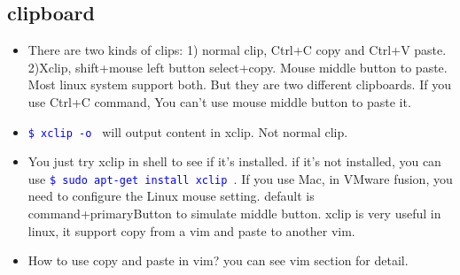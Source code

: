 \documentclass[a4paper,12pt,twoside]{book}
\newcommand{\linuxcommand}[1]{\texttt{\textcolor{blue}{\$ #1 \Pisymbol{psy}{191}}}}
\begin{document}
\subsection{clipboard}
	\begin{itemize}
			\item There are two kinds of clips: 1) normal clip, Ctrl+C copy and Ctrl+V paste. 2)Xclip, shift+mouse left button select+copy. Mouse middle button to paste. Most linux system support both. But they are two different clipboards. If you use Ctrl+C command, You can't use mouse middle button to paste it.
			
			\item \linuxcommand{xclip -o} will output content in xclip. Not normal clip.
					
			\item You just try xclip in shell to see if it's installed. if it's not installed, you can use \linuxcommand{sudo apt-get install xclip}. If you use Mac, in VMware fusion, you need to configure the Linux mouse setting.  default is command+primaryButton to simulate middle button.  xclip is very useful in linux, it support copy from a vim and paste to another vim.  

			\item How to use copy and paste in vim? you can see vim section for detail.
	\end{itemize}
\end{document}

